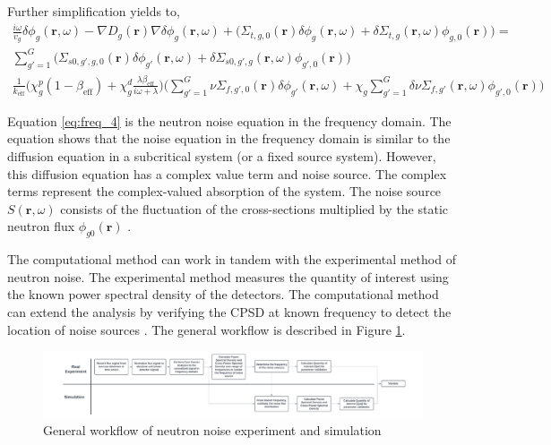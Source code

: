Further simplification yields to,
\begin{equation}
        \begin{aligned}
                \frac{i \omega}{v_g} \delta \phi_g (\textbf{r}, \omega) - \nabla D_g(\textbf{r}) \nabla \delta \phi_g(\textbf{r}, \omega) + \biggl(\Sigma_{t,g,0}(\textbf{r}) \delta \phi_g(\textbf{r}, \omega) + \delta \Sigma_{t,g}(\textbf{r}, \omega) \phi_{g,0}(\textbf{r}) \biggr) = \\
                \sum_{g' = 1}^{G} \biggl(\Sigma_{s0,g',g,0}(\textbf{r}) \delta \phi_{g'}(\textbf{r}, \omega) + \delta \Sigma_{s0,g',g}(\textbf{r}, \omega) \phi_{g',0}(\textbf{r}) \biggr)\\
                \frac{1}{k_{\text{eff}}} \biggl( \chi^p_g (1-\beta_{\text{eff}}) + \chi^d_g \frac{\lambda \beta_{\text{eff}}}{i \omega + \lambda} \biggr)  \biggl(\sum_{g' = 1}^{G} \nu \Sigma_{f,g',0}(\textbf{r}) \delta \phi_{g'}(\textbf{r}, \omega) + \chi_g \sum_{g' = 1}^{G} \delta \nu \Sigma_{f,g'}(\textbf{r}, \omega) \phi_{g',0}(\textbf{r}) \biggr)
        \end{aligned}
        \label{eq:freq_4}
\end{equation}

Equation \ref{eq:freq_4} is the neutron noise equation in the frequency domain. The equation shows that the noise equation in the frequency domain is similar to the diffusion equation in a subcritical system (or a fixed source system). However, this diffusion equation has a complex value term and noise source. The complex terms represent the complex-valued absorption of the system. The noise source  $S (\textbf{r}, \omega)$ consists of the fluctuation of the cross-sections multiplied by the static neutron flux $\phi_{g0} (\textbf{r})$ \cite{pazsitDynamicAdjointGreen2015}. 

The computational method can work in tandem with the experimental method of neutron noise. The experimental method measures the quantity of interest using the known power spectral density of the detectors. The computational method can extend the analysis by verifying the CPSD at known frequency to detect the location of noise sources \cite{hursinModelingNoiseExperiments2023}. The general workflow is described in Figure \ref{fig:flow_diagram}.
\begin{figure}[h]
        \centering
        \includegraphics[width=\textwidth]{figures/noise_workflow.png}
        \caption{General workflow of neutron noise experiment and simulation}
        \label{fig:flow_diagram}
\end{figure}

